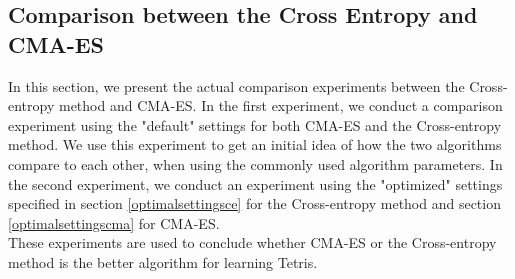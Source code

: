 \subsection{Comparison between the Cross Entropy and CMA-ES}

In this section, we present the actual comparison experiments between the Cross-entropy method
and CMA-ES.
In the first experiment, we conduct a comparison experiment using the 
"default" settings for both CMA-ES and the Cross-entropy method. We use this experiment to
get an initial idea of how the two algorithms compare to each other, when using the commonly
used algorithm parameters.
In the second experiment, we conduct an experiment using the "optimized" settings
specified in section \ref{optimalsettingsce} for the Cross-entropy method and section
\ref{optimalsettingscma} for CMA-ES.\\
These experiments are used to conclude whether CMA-ES or the Cross-entropy method
is the better algorithm for learning Tetris.






